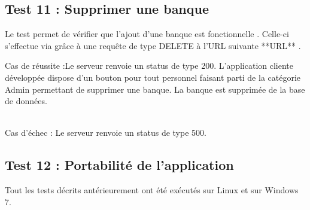 \subsection{Test 11 : Supprimer une banque}

Le test permet de vérifier que l'ajout d'une banque est fonctionnelle .
Celle-ci s'effectue via grâce à une requête de type DELETE à l'URL suivante **URL** .

Cas de réussite :Le serveur renvoie un status de type 200.
L'application cliente développée dispose d'un bouton pour tout personnel faisant parti de la catégorie Admin permettant de supprimer une banque. La banque est supprimée de la base de données.

\\
Cas d'échec : Le serveur renvoie un status de type 500.

\subsection{Test 12 : Portabilité de l'application}

Tout les tests décrits antérieurement ont été exécutés sur  Linux et sur Windows 7.